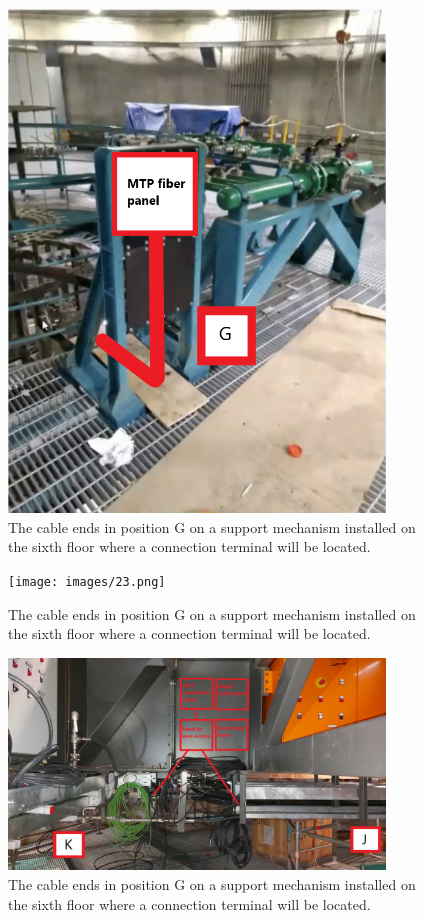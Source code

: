 \begin{figure}
  \centering
  \includegraphics[width=10cm]{images/21.png}
  \caption*{The cable ends in position G on a support mechanism installed on the sixth floor where a connection terminal will be located.}
\end{figure}

\begin{figure}
  \centering
  \texttt{[image: images/23.png]}
  \caption*{The cable ends in position G on a support mechanism installed on the sixth floor where a connection terminal will be located.}
\end{figure}

\begin{figure}
  \centering
  \includegraphics[width=10cm]{images/24.jpg}
  \caption*{The cable ends in position G on a support mechanism installed on the sixth floor where a connection terminal will be located.}
\end{figure}

